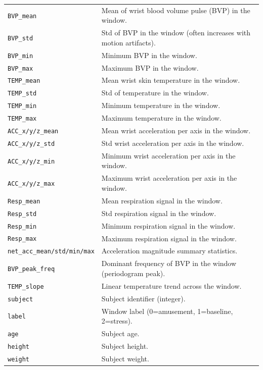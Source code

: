 \documentclass[11pt]{article}
\begin{document}
\begin{longtable}{@{}p{}p{}@{}}
\texttt{BVP\_mean} & Mean of wrist blood volume pulse (BVP) in the window. \\
\texttt{BVP\_std} & Std of BVP in the window (often increases with motion artifacts). \\
\texttt{BVP\_min} & Minimum BVP in the window. \\
\texttt{BVP\_max} & Maximum BVP in the window. \\

\texttt{TEMP\_mean} & Mean wrist skin temperature in the window. \\
\texttt{TEMP\_std} & Std of temperature in the window. \\
\texttt{TEMP\_min} & Minimum temperature in the window. \\
\texttt{TEMP\_max} & Maximum temperature in the window. \\

\texttt{ACC\_x/y/z\_mean} & Mean wrist acceleration per axis in the window. \\
\texttt{ACC\_x/y/z\_std} & Std wrist acceleration per axis in the window. \\
\texttt{ACC\_x/y/z\_min} & Minimum wrist acceleration per axis in the window. \\
\texttt{ACC\_x/y/z\_max} & Maximum wrist acceleration per axis in the window. \\

\texttt{Resp\_mean} & Mean respiration signal in the window. \\
\texttt{Resp\_std} & Std respiration signal in the window. \\
\texttt{Resp\_min} & Minimum respiration signal in the window. \\
\texttt{Resp\_max} & Maximum respiration signal in the window. \\

\texttt{net\_acc\_mean/std/min/max} & Acceleration magnitude summary statistics. \\
\texttt{BVP\_peak\_freq} & Dominant frequency of BVP in the window (periodogram peak). \\
\texttt{TEMP\_slope} & Linear temperature trend across the window. \\

\texttt{subject} & Subject identifier (integer). \\
\texttt{label} & Window label (0=amusement, 1=baseline, 2=stress). \\

\texttt{age} & Subject age. \\
\texttt{height} & Subject height. \\
\texttt{weight} & Subject weight. \\


\end{longtable}
\end{document}
